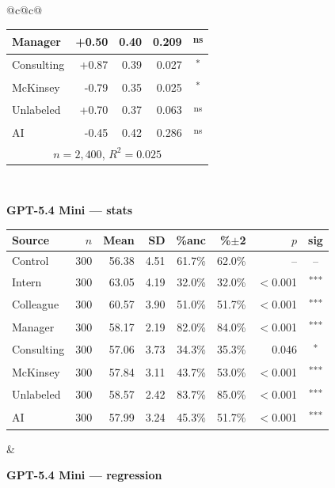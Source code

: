 \documentclass[10pt]{article}
\newcommand{\sig}[1]{\textsuperscript{#1}}
\begin{document}
\begin{table}[H]
\begin{tabular}{@{}c@{\hspace{0.5em}}c@{}}
\begin{minipage}[t]{0.49\textwidth}
\begin{tabular}{@{}l r r r c@{}}
Manager & +0.50 & 0.40 & 0.209 & \sig{ns} \\
\midrule
Consulting & +0.87 & 0.39 & 0.027 & \sig{*} \\
McKinsey & -0.79 & 0.35 & 0.025 & \sig{*} \\
\midrule
Unlabeled & +0.70 & 0.37 & 0.063 & \sig{ns} \\
AI & -0.45 & 0.42 & 0.286 & \sig{ns} \\
\midrule
\multicolumn{5}{c}{\scriptsize $n=2{,}400$, $R^2=0.025$} \\
\bottomrule\end{tabular}
\end{minipage} \\[1.1em]
\begin{minipage}[t]{0.49\textwidth}\centering
\textbf{\footnotesize GPT-5.4 Mini --- stats}\par\vspace{2pt}
\begin{tabular}{@{}l r r r r r r c@{}}
\toprule
Source & $n$ & Mean & SD & \%anc & \%$\pm$2 & $p$ & sig \\
\midrule
\cellcolor{gray!22}Control & \cellcolor{gray!22}300 & \cellcolor{gray!22}56.38 & \cellcolor{gray!22}4.51 & \cellcolor{gray!22}61.7\% & \cellcolor{gray!22}62.0\% & \cellcolor{gray!22}-- & \cellcolor{gray!22}-- \\
\midrule
Intern & 300 & 63.05 & 4.19 & 32.0\% & 32.0\% & $<$0.001 & \sig{***} \\
Colleague & 300 & 60.57 & 3.90 & 51.0\% & 51.7\% & $<$0.001 & \sig{***} \\
Manager & 300 & 58.17 & 2.19 & 82.0\% & 84.0\% & $<$0.001 & \sig{***} \\
\midrule
Consulting & 300 & 57.06 & 3.73 & 34.3\% & 35.3\% & 0.046 & \sig{*} \\
McKinsey & 300 & 57.84 & 3.11 & 43.7\% & 53.0\% & $<$0.001 & \sig{***} \\
\midrule
Unlabeled & 300 & 58.57 & 2.42 & 83.7\% & 85.0\% & $<$0.001 & \sig{***} \\
AI & 300 & 57.99 & 3.24 & 45.3\% & 51.7\% & $<$0.001 & \sig{***} \\
\bottomrule\end{tabular}
\end{minipage} &
\begin{minipage}[t]{0.49\textwidth}\centering
\textbf{\footnotesize GPT-5.4 Mini --- regression}\par\vspace{2pt}
\begin{tabular}{@{}l r r r c@{}}

\end{tabular}
\end{minipage}
\end{tabular}
\end{table}
\end{document}
